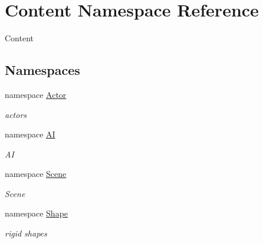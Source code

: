 \hypertarget{namespaceContent}{
\section{Content Namespace Reference}
\label{namespaceContent}
}


Content  
\subsection*{Namespaces}
\begin{DoxyCompactItemize}
\item 
namespace \hyperlink{namespaceContent_1_1Actor}{Actor}


\begin{DoxyCompactList}\small\item\em actors \item\end{DoxyCompactList}\item 
namespace \hyperlink{namespaceContent_1_1AI}{AI}


\begin{DoxyCompactList}\small\item\em AI \item\end{DoxyCompactList}\item 
namespace \hyperlink{namespaceContent_1_1Scene}{Scene}


\begin{DoxyCompactList}\small\item\em Scene \item\end{DoxyCompactList}\item 
namespace \hyperlink{namespaceContent_1_1Shape}{Shape}


\begin{DoxyCompactList}\small\item\em rigid shapes \item\end{DoxyCompactList}\end{DoxyCompactItemize}
